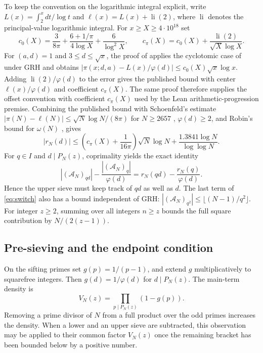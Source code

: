 \documentclass[11pt]{article}
\theoremstyle{remark}\newtheorem{remark}[theorem]{Remark}
\begin{document}
To keep the convention on the logarithmic integral explicit, write
$L(x)=\int_2^x dt/\log t$ and $\ell(x)=L(x)+\operatorname{li}(2)$,
where $\operatorname{li}$ denotes the principal-value logarithmic integral.
For $x\ge X\ge 4\cdot10^{18}$ set
\[
 c_0(X)=\frac{3}{8\pi}+\frac{6+1/\pi}{4\log X}
              +\frac{6}{\log^2 X},\qquad
 c_\pi(X)=c_0(X)+\frac{\operatorname{li}(2)}{\sqrt X\log X}.
\]
For $(a,d)=1$ and $3\le d\le\sqrt x$, the proof of
\cite[Lemma~5.1]{JS} applies the cyclotomic case of
\cite[Corollary~1]{GM} under GRH and obtains
$|\pi(x;d,a)-L(x)/\varphi(d)|\le c_0(X)\sqrt x\log x$.
Adding $\operatorname{li}(2)/\varphi(d)$ to the error gives the
published bound with center $\ell(x)/\varphi(d)$ and coefficient
$c_\pi(X)$. The same proof therefore supplies the offset convention
with coefficient $c_\pi(X)$ used by the Lean arithmetic-progression
premise. Combining the published bound with Schoenfeld's estimate
$|\pi(N)-\ell(N)|\le\sqrt N\log N/(8\pi)$ for $N\ge2657$
\cite{Schoenfeld}, $\varphi(d)\ge2$, and Robin's bound for
$\omega(N)$ \cite{Robin}, gives
\begin{equation}\label{eq:aperror}
 |r_N(d)|\le \left(c_\pi(X)+\frac1{16\pi}\right)\sqrt N\log N
                  +\frac{1.3841\log N}{\log\log N}.
\end{equation}
For $q\in I$ and $d\mid P_N(z)$, coprimality yields the exact identity
\[
 |(\mathcal A_N)_{qd}|-\frac{|(\mathcal A_N)_q|}{\varphi(d)}
            =r_N(qd)-\frac{r_N(q)}{\varphi(d)}.
\]
Hence the upper sieve must keep track of $qd$ as well as $d$.
The last term of \eqref{eq:switch} also has a bound independent of GRH:
$|(\mathcal A_N)_{q^2}|\le\lfloor(N-1)/q^2\rfloor$. For integer $z\ge2$,
summing over all integers $n\ge z$ bounds the full square contribution
by $N/(2(z-1))$.

\subsection{Pre-sieving and the endpoint condition}\label{sec:presieve}

On the sifting primes set $g(p)=1/(p-1)$, and extend $g$
multiplicatively to squarefree integers. Then
$g(d)=1/\varphi(d)$ for $d\mid P_N(z)$. The main-term density is
\[
 V_N(z)=\prod_{p\mid P_N(z)}(1-g(p)).
\]
Removing a prime divisor of $N$ from a full product over the odd primes
increases the density. When a lower and an upper sieve are subtracted,
this observation may be applied to their common factor $V_N(z)$ once
the remaining bracket has been bounded below by a positive number.
\end{document}

